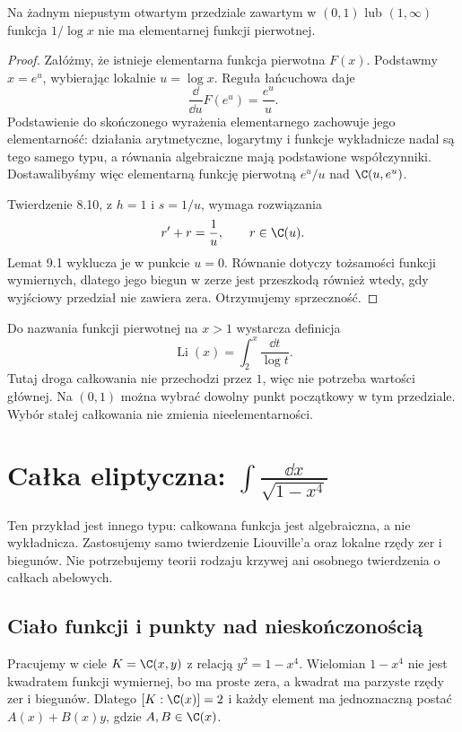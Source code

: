 \begin{twierdzenie}
Na żadnym niepustym otwartym przedziale zawartym w $(0,1)$ lub $(1,\infty)$ funkcja $1/\log x$ nie ma elementarnej funkcji pierwotnej.
\end{twierdzenie}
\begin{proof}
Załóżmy, że istnieje elementarna funkcja pierwotna $F(x)$. Podstawmy $x=e^u$, wybierając lokalnie $u=\log x$. Reguła łańcuchowa daje
\[
\frac{\dd}{\dd u}F(e^u)=\frac{e^u}{u}.
\]
Podstawienie do skończonego wyrażenia elementarnego zachowuje jego elementarność: działania arytmetyczne, logarytmy i funkcje wykładnicze nadal są tego samego typu, a równania algebraiczne mają podstawione współczynniki. Dostawalibyśmy więc elementarną funkcję pierwotną $e^u/u$ nad $\C(u,e^u)$.

Twierdzenie 8.10, z $h=1$ i $s=1/u$, wymaga rozwiązania
\[
r'+r=\frac1u,\qquad r\in\C(u).
\]
Lemat 9.1 wyklucza je w punkcie $u=0$. Równanie dotyczy tożsamości funkcji wymiernych, dlatego jego biegun w zerze jest przeszkodą również wtedy, gdy wyjściowy przedział nie zawiera zera. Otrzymujemy sprzeczność.
\end{proof}

Do nazwania funkcji pierwotnej na $x>1$ wystarcza definicja
\[
\operatorname{Li}(x)=\int_2^x\frac{\dd t}{\log t}.
\]
Tutaj droga całkowania nie przechodzi przez $1$, więc nie potrzeba wartości głównej. Na $(0,1)$ można wybrać dowolny punkt początkowy w tym przedziale. Wybór stałej całkowania nie zmienia nieelementarności.

\section{Całka eliptyczna: $\int \frac{\dd x}{\sqrt{1-x^4}}$}

Ten przykład jest innego typu: całkowana funkcja jest algebraiczna, a nie wykładnicza. Zastosujemy samo twierdzenie Liouville'a oraz lokalne rzędy zer i biegunów. Nie potrzebujemy teorii rodzaju krzywej ani osobnego twierdzenia o całkach abelowych.

\subsection{Ciało funkcji i punkty nad nieskończonością}

Pracujemy w ciele $K=\C(x,y)$ z relacją $y^2=1-x^4$. Wielomian $1-x^4$ nie jest kwadratem funkcji wymiernej, bo ma proste zera, a kwadrat ma parzyste rzędy zer i biegunów. Dlatego $[K:\C(x)]=2$ i każdy element ma jednoznaczną postać $A(x)+B(x)y$, gdzie $A,B\in\C(x)$.

